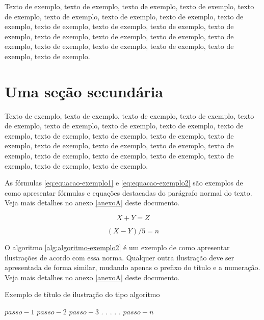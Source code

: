 \documentclass[
	12pt,				%
	oneside,			%
	a4paper,			%
	english,			%
	brazil				%
	]{abntex2ppgsi}
\begin{document}
Texto de exemplo, texto de exemplo, texto de exemplo, texto de exemplo, texto de exemplo, texto de exemplo, texto de exemplo, texto de exemplo, texto de exemplo, texto de exemplo, texto de exemplo, texto de exemplo, texto de exemplo, texto de exemplo, texto de exemplo, texto de exemplo, texto de exemplo, texto de exemplo, texto de exemplo, texto de exemplo, texto de exemplo, texto de exemplo.

\section{Uma seção secundária}

Texto de exemplo, texto de exemplo, texto de exemplo, texto de exemplo, texto de exemplo, texto de exemplo, texto de exemplo, texto de exemplo, texto de exemplo, texto de exemplo, texto de exemplo, texto de exemplo, texto de exemplo, texto de exemplo, texto de exemplo, texto de exemplo, texto de exemplo, texto de exemplo, texto de exemplo, texto de exemplo, texto de exemplo, texto de exemplo, texto de exemplo.

As fórmulas \ref{eq:equacao-exemplo1} e \ref{eq:equacao-exemplo2} são exemplos de como apresentar fórmulas e equações destacadas do parágrafo normal do texto. Veja mais detalhes no anexo \ref{anexoA} deste documento.

\begin{equation}
  X + Y = Z
	\label{eq:equacao-exemplo1}
\end{equation}

\begin{equation}
  (X - Y)/5 = n
	\label{eq:equacao-exemplo2}
\end{equation}


O algoritmo \ref{alg:algoritmo-exemplo2} é um exemplo de como apresentar ilustrações de acordo com essa norma. Qualquer outra ilustração deve ser apresentada de forma similar, mudando apenas o prefixo do título e a numeração. Veja mais detalhes no anexo \ref{anexoA} deste documento.

\begin{algorithm}[htbp]
\caption{Exemplo de título de ilustração do tipo algoritmo}
\label{alg:algoritmo-exemplo2}
\begin{algorithmic}[1]
\State $passo-1$
\State $passo-2$
\State $passo-3$
\State $.$
\State $.$
\State $.$
\State $.$
\State $.$
\State $passo-n$
\EndProcedure
\end{algorithmic}
\end{algorithm}
\end{document}
